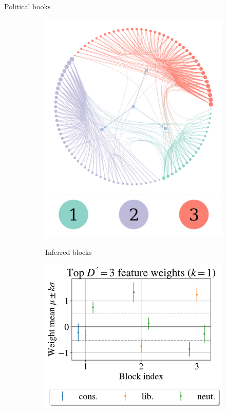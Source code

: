 \documentclass{beamer}
\begin{document}
	\begin{frame}{Political books \cite{polbooks}}
		\begin{figure}[!h]
			\centering
			\begin{subfigure}[t]{0.3\linewidth}
				\centering
				\vskip 0pt
				\includegraphics[width=\linewidth]{polbooks-graph}
				\includegraphics[width=0.6\linewidth]{3-horizontal-legend}
				\caption{Inferred blocks}
			\end{subfigure}
			\hspace{1cm}
			\begin{subfigure}[t]{0.452\linewidth}
				\centering
				\vskip 0pt
				\includegraphics[width=\linewidth]{polbooks-null-1}

\end{subfigure}
\end{figure}
\end{frame}
\end{document}
